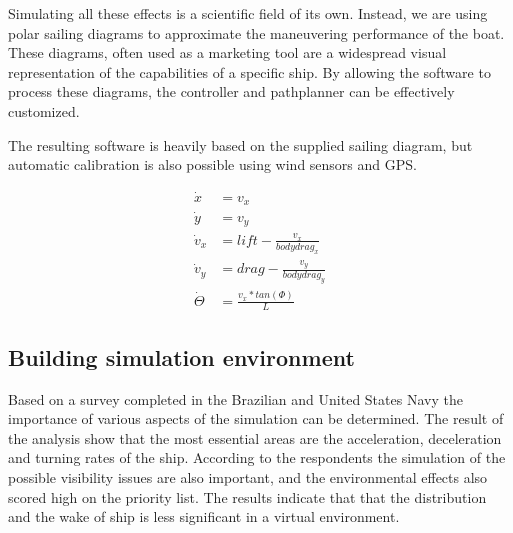 Simulating all these effects is a scientific field of its own. Instead, we are using polar sailing diagrams to approximate the maneuvering performance of the boat. These diagrams, often used as a marketing tool are a widespread visual representation of the capabilities of a specific ship. By allowing the software to process these diagrams, the controller and pathplanner can be effectively customized.

The resulting software is heavily based on the supplied sailing diagram, but automatic calibration is also possible using wind sensors and GPS.

\begin{align}
		\dot{x} &= v_x
	\\	\dot{y} &= v_y
	\\	\dot{v}_x &= lift - \frac{v_x}{bodydrag_x}
	\\	\dot{v}_y &= drag - \frac{v_y}{bodydrag_y}
	\\	\dot{\Theta} &= \frac{v_x * tan(\Phi)}{L}
\end{align}

\subsection{Building simulation environment}

Based on a survey completed in the Brazilian and United States Navy the importance of various aspects of the simulation can be determined\cite[p.~6]{shipsim}. The result of the analysis show that the most essential areas are the acceleration, deceleration and turning rates of the ship. According to the respondents the simulation of the possible visibility issues are also important, and the environmental effects also scored high on the priority list. The results indicate that that the distribution and the wake of ship is less significant in a virtual environment.


